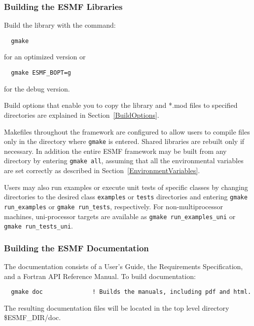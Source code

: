 \subsubsection{Building the ESMF Libraries}
\label{BuildESMF}



Build the library with the command:
\begin{verbatim}
  gmake 
\end{verbatim}
  for an optimized version or
\begin{verbatim}
  gmake ESMF_BOPT=g  
\end{verbatim}
  for the debug version.


Build options that enable you to copy the library and *.mod files to
specified directories are explained in Section~\ref{BuildOptions}. 

Makefiles throughout the framework are configured to allow users to
compile files only in the directory where {\tt gmake} is entered. Shared
libraries are rebuilt only if necessary. In addition the entire ESMF
framework may be built from any directory by entering {\tt gmake all},
assuming that all the environmental variables are set correctly as
described in Section~\ref{EnvironmentVariables}.

Users may also run examples or execute unit tests of specific classes
by changing directories to the desired class {\tt examples} or {\tt tests} 
directories and entering {\tt gmake run\_examples} or 
{\tt gmake run\_tests}, respectively.  For non-multiprocessor machines,
uni-processor targets are available as {\tt gmake run\_examples\_uni} or
{\tt gmake run\_tests\_uni}.

\subsubsection{Building the ESMF Documentation}
\label{BuildDocumentation}

The documentation consists of a User's Guide, the Requirements Specification,
and a Fortran API Reference Manual.  
\noindent To build documentation:
\begin{verbatim}
  gmake doc              ! Builds the manuals, including pdf and html.
\end{verbatim}

\noindent The resulting documentation files will be
located in the top level directory \${ESMF\_DIR}/doc.

